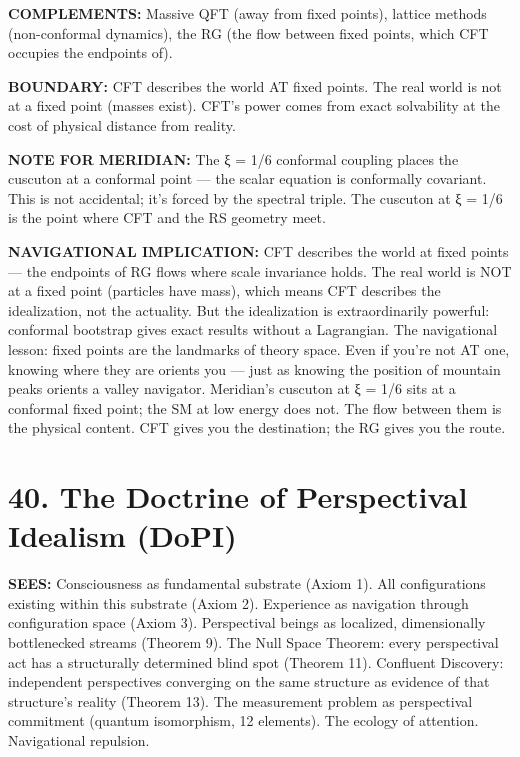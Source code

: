 \textbf{COMPLEMENTS:} Massive QFT (away from fixed points), lattice methods (non-conformal dynamics), the RG (the flow between fixed points, which CFT occupies the endpoints of).


\textbf{BOUNDARY:} CFT describes the world AT fixed points. The real world is not at a fixed point (masses exist). CFT's power comes from exact solvability at the cost of physical distance from reality.


\textbf{NOTE FOR MERIDIAN:} The ξ = 1/6 conformal coupling places the cuscuton at a conformal point — the scalar equation is conformally covariant. This is not accidental; it's forced by the spectral triple. The cuscuton at ξ = 1/6 is the point where CFT and the RS geometry meet.


\textbf{NAVIGATIONAL IMPLICATION:} CFT describes the world at fixed points — the endpoints of RG flows where scale invariance holds. The real world is NOT at a fixed point (particles have mass), which means CFT describes the idealization, not the actuality. But the idealization is extraordinarily powerful: conformal bootstrap gives exact results without a Lagrangian. The navigational lesson: fixed points are the landmarks of theory space. Even if you're not AT one, knowing where they are orients you — just as knowing the position of mountain peaks orients a valley navigator. Meridian's cuscuton at ξ = 1/6 sits at a conformal fixed point; the SM at low energy does not. The flow between them is the physical content. CFT gives you the destination; the RG gives you the route.


\bigskip\noindent\makebox[\textwidth]{\color{rulegray}\rule{5cm}{0.3pt}}\bigskip


\section*{40. The Doctrine of Perspectival Idealism (DoPI)}


\textbf{SEES:} Consciousness as fundamental substrate (Axiom 1). All configurations existing within this substrate (Axiom 2). Experience as navigation through configuration space (Axiom 3). Perspectival beings as localized, dimensionally bottlenecked streams (Theorem 9). The Null Space Theorem: every perspectival act has a structurally determined blind spot (Theorem 11). Confluent Discovery: independent perspectives converging on the same structure as evidence of that structure's reality (Theorem 13). The measurement problem as perspectival commitment (quantum isomorphism, 12 elements). The ecology of attention. Navigational repulsion.


